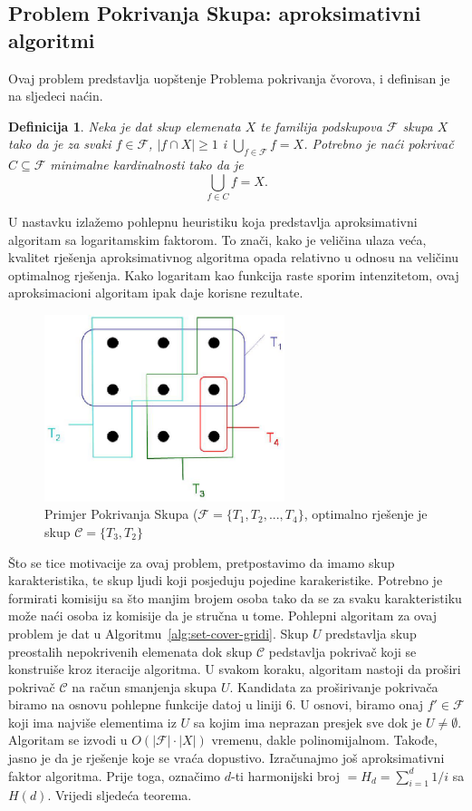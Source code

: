 \documentclass[a4paper, utf8, 11pt, colorlinks]{book}
\newtheorem{definition}{Definicija}
\begin{document}
 \subsection{Problem Pokrivanja Skupa: aproksimativni algoritmi}
Ovaj problem predstavlja uopštenje Problema pokrivanja čvorova, i definisan je na sljedeci naćin.
\begin{definition}
	    Neka je dat skup elemenata $X$ te familija podskupova $\mathcal{F}$ skupa $X$ tako da je za svaki $f\in \mathcal{F}$, $|f \cap X| \geq 1$ i $\bigcup_{f \in \mathcal{F}} f = X$. 
	    Potrebno je naći pokrivač $C \subseteq \mathcal{F}$ minimalne kardinalnosti tako da je 
	    $$ \bigcup_{f \in C} f = X.$$
\end{definition}
 U nastavku izlažemo pohlepnu heuristiku koja predstavlja aproksimativni algoritam sa logaritamskim faktorom. To znači, kako je veličina ulaza veća, kvalitet rješenja aproksimativnog algoritma opada relativno u odnosu na veličinu optimalnog rješenja. Kako logaritam kao funkcija raste sporim intenzitetom, ovaj aproksimacioni algoritam ipak daje korisne rezultate.

\begin{figure}
	\centering
	\includegraphics[width=70mm]{set-cover-1.eps}
	\caption{Primjer Pokrivanja Skupa ($\mathcal{F}=\{T_1,T_2,...,T_4\}$, optimalno rješenje je skup $\mathcal{C}=\{T_3, T_2\}$}
	 \label{fig:set-cover-1}
\end{figure}

Što se tice motivacije za ovaj problem, pretpostavimo da imamo skup karakteristika, te skup ljudi koji posjeduju pojedine karakeristike. Potrebno je formirati komisiju sa što manjim brojem osoba tako da se za svaku karakteristiku može naći osoba iz komisije da je stručna u tome. Pohlepni algoritam za ovaj problem je dat u Algoritmu~\ref{alg:set-cover-gridi}.  %
Skup $U$ predstavlja skup preostalih nepokrivenih elemenata dok skup $\mathcal{C}$ pedstavlja pokrivač koji se konstruiše kroz iteracije algoritma. U svakom koraku, algoritam nastoji da proširi pokrivač $\mathcal{C}$ na račun smanjenja skupa $U$. Kandidata za proširivanje pokrivača biramo na osnovu pohlepne funkcije datoj u liniji 6. U osnovi, biramo onaj $f' \in \mathcal{F}$ koji ima najviše  elementima iz $U$ sa kojim ima neprazan presjek sve dok je $U \neq \emptyset$. Algoritam se izvodi u $O(|\mathcal{F}| \cdot |X|)$ vremenu, dakle  polinomijalnom. Takođe, jasno je da je rješenje koje se vraća dopustivo. Izračunajmo još aproksimativni faktor algoritma. Prije toga, označimo $d$-ti harmonijski broj $=H_d = \sum_{i=1}^d 1/i$ sa $H(d)$. 
Vrijedi sljedeća teorema.
\end{document}
